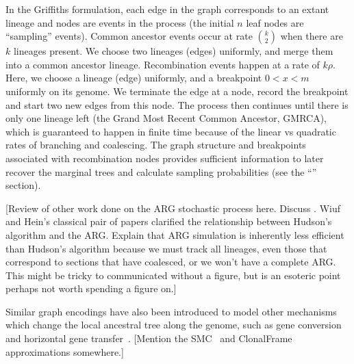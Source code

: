 \documentclass{article}
\begin{document}
In the Griffiths formulation, each edge in the graph corresponds to an extant
lineage and nodes are events in the process (the initial $n$ leaf nodes are
``sampling'' events). Common ancestor events occur at rate $\binom{k}{2}$ when there
are $k$ lineages present. We choose two lineages (edges) uniformly, and merge them
into a common ancestor lineage. Recombination events happen at a rate of
$k \rho$. Here, we choose a lineage (edge) uniformly, and a
breakpoint $0 < x < m$ uniformly on its genome. We terminate the edge at a
node, record the breakpoint and start two new edges from this node. The process
then continues until there is only one lineage left (the Grand Most Recent
Common Ancestor, GMRCA), which is guaranteed to
happen in finite time because of the linear vs quadratic rates of branching
and coalescing. The graph structure and breakpoints associated with
recombination nodes provides sufficient information to later recover the marginal
trees and calculate sampling probabilities (see the ``'' section).

[Review of other work done on the ARG stochastic process here.
Discuss \citet{wiuf1999ancestry}. Wiuf and Hein's classical pair of papers
clarified the relationship between Hudson's algorithm and the ARG.
Explain that ARG simulation is inherently less efficient than Hudson's
algorithm because we must track all lineages, even those that correspond
to sections that have coalesced, or we won't have a complete ARG.
This might be tricky to communicated without a figure, but is an
esoteric point perhaps not worth spending a figure on.]

Similar graph encodings have also been introduced to model other mechanisms
which change the local ancestral tree along the genome, such as gene
conversion~\citep{wiuf2000coalescent} and
horizontal gene transfer~\citep{baumdicker2014infinitely}.
[Mention the
SMC~\citep{mcvean2005approximating,marjoram2006fast}
and ClonalFrame~\citep{didelot2007inference} approximations somewhere.]
\end{document}

